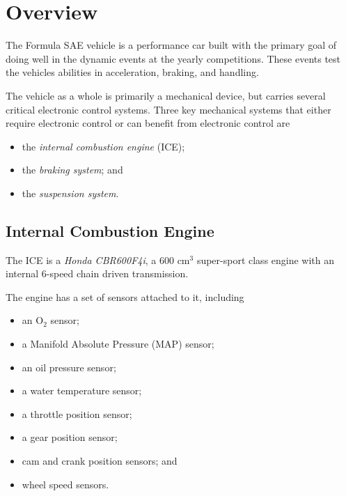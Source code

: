 %
%
%
%

\section{Overview}

The Formula SAE vehicle is a performance car built with the primary goal of doing well in the 
dynamic events at the yearly competitions. These events test the vehicles abilities in acceleration, 
braking, and handling.

The vehicle as a whole is primarily a mechanical device, but carries several critical electronic 
control systems. Three key mechanical systems that either require electronic control or can benefit 
from electronic control are

\begin{itemize}
\item the \emph{internal combustion engine} (ICE); 
\item the \emph{braking system}; and
\item the \emph{suspension system}.
\end{itemize}

\subsection{Internal Combustion Engine}

The ICE is a \emph{Honda CBR600F4i}, a 600 cm$^3$ super-sport class engine with an internal 6-speed 
chain driven transmission. 

The engine has a set of sensors attached to it, including

\begin{itemize}
\item an O$_{2}$ sensor;
\item a Manifold Absolute Pressure (MAP) sensor; 
\item an oil pressure sensor;
\item a water temperature sensor;
\item a throttle position sensor;
\item a gear position sensor;
\item cam and crank position sensors; and
\item wheel speed sensors.
\end{itemize}

